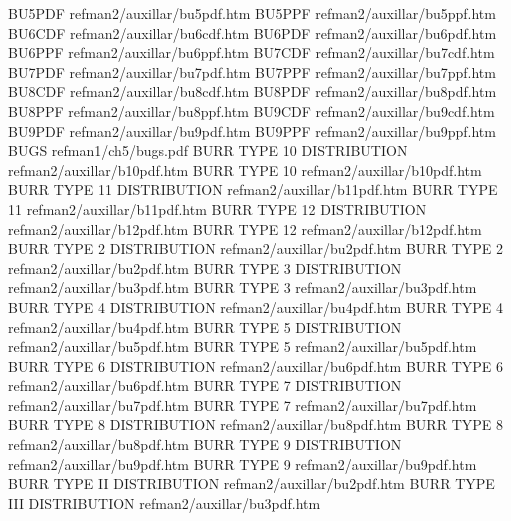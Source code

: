 BU5PDF                                  refman2/auxillar/bu5pdf.htm
BU5PPF                                  refman2/auxillar/bu5ppf.htm
BU6CDF                                  refman2/auxillar/bu6cdf.htm
BU6PDF                                  refman2/auxillar/bu6pdf.htm
BU6PPF                                  refman2/auxillar/bu6ppf.htm
BU7CDF                                  refman2/auxillar/bu7cdf.htm
BU7PDF                                  refman2/auxillar/bu7pdf.htm
BU7PPF                                  refman2/auxillar/bu7ppf.htm
BU8CDF                                  refman2/auxillar/bu8cdf.htm
BU8PDF                                  refman2/auxillar/bu8pdf.htm
BU8PPF                                  refman2/auxillar/bu8ppf.htm
BU9CDF                                  refman2/auxillar/bu9cdf.htm
BU9PDF                                  refman2/auxillar/bu9pdf.htm
BU9PPF                                  refman2/auxillar/bu9ppf.htm
BUGS                                    refman1/ch5/bugs.pdf
BURR TYPE 10 DISTRIBUTION               refman2/auxillar/b10pdf.htm
BURR TYPE 10                            refman2/auxillar/b10pdf.htm
BURR TYPE 11 DISTRIBUTION               refman2/auxillar/b11pdf.htm
BURR TYPE 11                            refman2/auxillar/b11pdf.htm
BURR TYPE 12 DISTRIBUTION               refman2/auxillar/b12pdf.htm
BURR TYPE 12                            refman2/auxillar/b12pdf.htm
BURR TYPE 2 DISTRIBUTION                refman2/auxillar/bu2pdf.htm
BURR TYPE 2                             refman2/auxillar/bu2pdf.htm
BURR TYPE 3 DISTRIBUTION                refman2/auxillar/bu3pdf.htm
BURR TYPE 3                             refman2/auxillar/bu3pdf.htm
BURR TYPE 4 DISTRIBUTION                refman2/auxillar/bu4pdf.htm
BURR TYPE 4                             refman2/auxillar/bu4pdf.htm
BURR TYPE 5 DISTRIBUTION                refman2/auxillar/bu5pdf.htm
BURR TYPE 5                             refman2/auxillar/bu5pdf.htm
BURR TYPE 6 DISTRIBUTION                refman2/auxillar/bu6pdf.htm
BURR TYPE 6                             refman2/auxillar/bu6pdf.htm
BURR TYPE 7 DISTRIBUTION                refman2/auxillar/bu7pdf.htm
BURR TYPE 7                             refman2/auxillar/bu7pdf.htm
BURR TYPE 8 DISTRIBUTION                refman2/auxillar/bu8pdf.htm
BURR TYPE 8                             refman2/auxillar/bu8pdf.htm
BURR TYPE 9 DISTRIBUTION                refman2/auxillar/bu9pdf.htm
BURR TYPE 9                             refman2/auxillar/bu9pdf.htm
BURR TYPE II DISTRIBUTION               refman2/auxillar/bu2pdf.htm
BURR TYPE III DISTRIBUTION              refman2/auxillar/bu3pdf.htm

